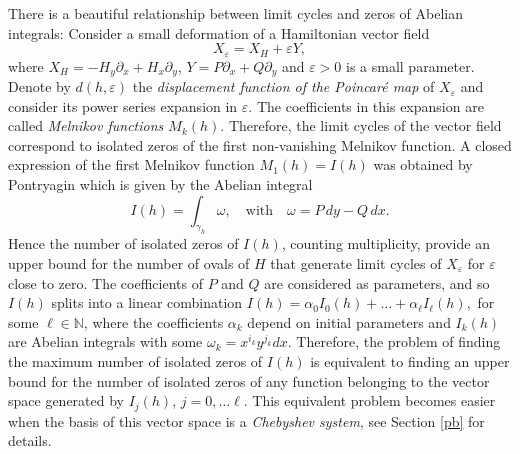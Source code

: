 \documentclass[12pt,psamsfonts]{amsart}
\begin{document}
 There is
a beautiful relationship between limit cycles and zeros of Abelian integrals: Consider a small
deformation of a Hamiltonian vector field
\begin{equation*}
    X_{\varepsilon} = X_H + {\varepsilon} Y,
\end{equation*}
where $X_H=-H_y {\partial}_x + H_x{\partial}_y$, $Y=P {\partial}_x + Q{\partial}_y$ and ${\varepsilon}>0$ is a small parameter. Denote by
$d(h,{\varepsilon})$ the \emph{displacement function of the  Poincar\'{e} map} of $X_{\varepsilon}$ and consider its
power series expansion in ${\varepsilon}$. The  coefficients in this expansion are called \emph{Melnikov
functions $M_k(h)$}. Therefore, the limit cycles of the vector field correspond to isolated zeros
of the first non-vanishing Melnikov function. A closed expression of the  first Melnikov function
$M_1(h)=I(h)$ was obtained by Pontryagin which is  given by the Abelian integral
\[I(h)=\int_{{\gamma}_h} {\omega},\quad \mbox{with}\quad {\omega}=P \,dy-Q\, dx.\]
 Hence the number of isolated zeros of $I(h)$, counting multiplicity, provide an
upper bound for the number of ovals of $H$ that generate limit cycles of $X_{\varepsilon}$ for ${\varepsilon}$ close
to zero. The coefficients of $P$ and $Q$ are considered as parameters, and so $I(h)$ splits into a
linear combination $I(h)=\alpha_0 I_0(h)+ \dots + \alpha_{\ell} I_{\ell}(h),$ for some
$\ell\in{\mathbb{N}}$, where the coefficients $\alpha_k$ depend on initial parameters and $I_k(h)$ are
Abelian integrals with some ${\omega}_k=x^{i_k} y^{j_k} dx$. Therefore, the problem of finding the
maximum number of isolated zeros of $I(h)$ is equivalent to finding an upper bound for the number
of isolated zeros of any function belonging to the vector space generated by $I_j(h)$, $j=0, \dots
\ell.$ This equivalent problem becomes easier when the basis of this vector space is
a \emph{Chebyshev system}, see Section \ref{pb} for details.\\
\end{document}
